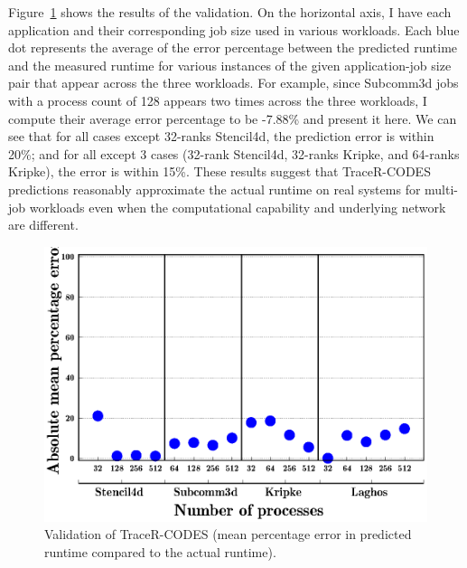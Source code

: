 Figure~\ref{fig:validation} shows the results of the validation. On the
horizontal axis, I have each application and their corresponding job size used
in various workloads. Each blue dot represents the average 
of the error percentage between the predicted runtime and the measured runtime
for various
instances of the given application-job size pair that appear across the three workloads. For
example, since Subcomm3d jobs with a process count of 128 appears two times
across the three workloads, I compute their average error percentage to be
-7.88\% and present it here. We can see that for all cases except 32-ranks
Stencil4d, the prediction error is within 20\%; and for all except 3 cases
(32-rank Stencil4d, 32-ranks Kripke, and 64-ranks Kripke), the error is within 15\%.
These results suggest that TraceR-CODES predictions reasonably approximate 
the actual runtime on real systems for multi-job workloads even when the
computational capability and underlying network are different.

\begin{figure}[h]
\centering
\includegraphics[width=\columnwidth]{figure/val/quartz.eps}
\caption{Validation of TraceR-CODES (mean percentage error in predicted runtime compared to the actual runtime).}
\label{fig:validation}
\end{figure}

